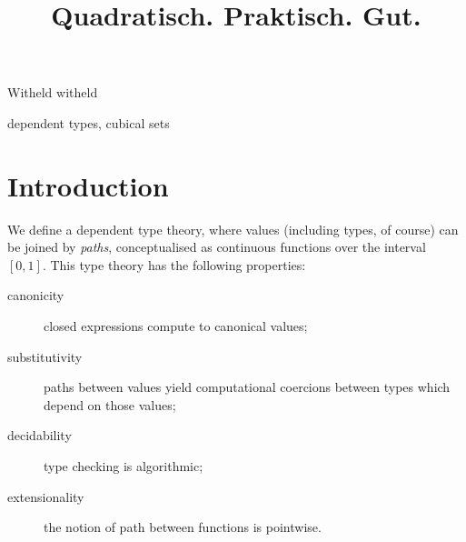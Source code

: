 \documentclass{sigplanconf}
\begin{document}
\setlength{\pdfpageheight}{\paperheight}
\setlength{\pdfpagewidth}{\paperwidth}






\title{Quadratisch. Praktisch. Gut.}

           {Witheld}
           {witheld}

\maketitle

\begin{abstract}
\end{abstract}



\keywords
dependent types, cubical sets

\section{Introduction}

We define a dependent type theory, where values (including types, of
course) can be joined by \emph{paths}, conceptualised as continuous
functions over the interval $[0,1]$. This type theory has the
following properties:
\begin{description}
\item[canonicity] closed expressions compute to canonical values;
\item[substitutivity] paths between values yield
  computational coercions between types which depend on those values;
\item[decidability] type checking is algorithmic;
\item[extensionality] the notion of path between
  functions is pointwise.
\end{description}
\end{document}
